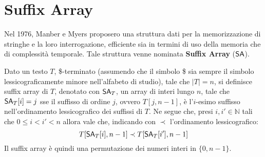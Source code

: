 \section{Suffix Array}
Nel 1976, Manber e Myers \cite{sa} proposero una struttura dati per la
memorizzazione di 
stringhe e la loro interrogazione, efficiente sia in termini di uso della
memoria che di complessità temporale. Tale struttura venne nominata
\textbf{Suffix Array} ($\mbox{\rm {\sf SA}}$).
\begin{definizione}
  Dato un testo $T$, \$-terminato (assumendo che il simbolo \$ sia sempre il
  simbolo lessicograficamente minore nell'alfabeto di studio), tale che $|T|=n$,
  si definisce suffix 
    array di $T$, denotato con $\mbox{\rm {\sf SA}}_T$, un array di interi lungo $n$, tale che
  $\mbox{\rm {\sf SA}}_T[i]=j$ sse il suffisso di ordine $j$, ovvero $T[j,n-1]$, è
  l'$i$-esimo suffisso nell’ordinamento lessicografico dei suffissi di $T$. Ne
  segue che, presi $i,i'\in \mathbb{N}$
  tali che $0\leq i < i' < n$ allora vale che, indicando con $\prec$
  l'ordinamento lessicografico:
  \begin{equation}
    \label{eq:saord}
    T[\mbox{\rm {\sf SA}}_T[i],n-1] \prec T[\mbox{\rm {\sf SA}}_T[i'],n-1]
  \end{equation}
  Il suffix array è quindi una permutazione dei numeri interi in
  $\{0,n-1\}$. 
\end{definizione}
